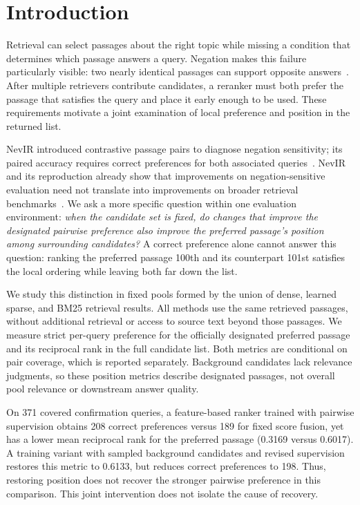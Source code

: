 \section{Introduction}
\label{sec:introduction}

Retrieval can select passages about the right topic while missing a condition that determines which passage answers a query. Negation makes this failure particularly visible: two nearly identical passages can support opposite answers~\cite{weller-etal-2024-nevir}. After multiple retrievers contribute candidates, a reranker must both prefer the passage that satisfies the query and place it early enough to be used. These requirements motivate a joint examination of local preference and position in the returned list.

NevIR introduced contrastive passage pairs to diagnose negation sensitivity; its paired accuracy requires correct preferences for both associated queries~\cite{weller-etal-2024-nevir}. NevIR and its reproduction already show that improvements on negation-sensitive evaluation need not translate into improvements on broader retrieval benchmarks~\cite{weller-etal-2024-nevir,elsen_reproducing_2025}. We ask a more specific question within one evaluation environment: \emph{when the candidate set is fixed, do changes that improve the designated pairwise preference also improve the preferred passage's position among surrounding candidates?} A correct preference alone cannot answer this question: ranking the preferred passage 100th and its counterpart 101st satisfies the local ordering while leaving both far down the list.

We study this distinction in fixed pools formed by the union of dense, learned sparse, and BM25 retrieval results. All methods use the same retrieved passages, without additional retrieval or access to source text beyond those passages. We measure strict per-query preference for the officially designated preferred passage and its reciprocal rank in the full candidate list. Both metrics are conditional on pair coverage, which is reported separately. Background candidates lack relevance judgments, so these position metrics describe designated passages, not overall pool relevance or downstream answer quality.

On 371 covered confirmation queries, a feature-based ranker trained with pairwise supervision obtains 208 correct preferences versus 189 for fixed score fusion, yet has a lower mean reciprocal rank for the preferred passage (0.3169 versus 0.6017). A training variant with sampled background candidates and revised supervision restores this metric to 0.6133, but reduces correct preferences to 198. Thus, restoring position does not recover the stronger pairwise preference in this comparison. This joint intervention does not isolate the cause of recovery.


